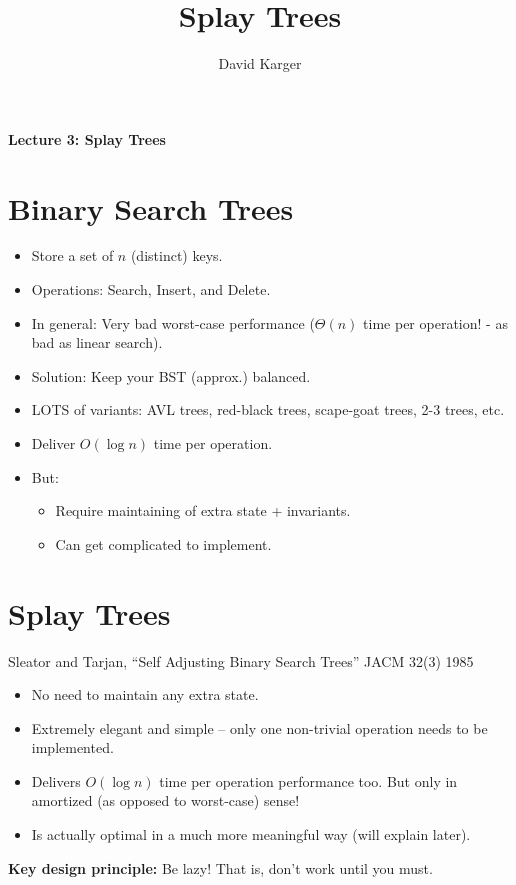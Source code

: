 \documentclass{article}
\title{Splay Trees}
\author{David Karger}
\begin{document}

\begin{center}
{\bf  Lecture 3: Splay Trees}
\end{center}

\section{Binary Search Trees}

\begin{itemize}
\item Store a set of $n$ (distinct) keys.
\item Operations: Search, Insert, and Delete.
\item In general: Very bad worst-case performance ($\Theta(n)$ time per operation! - as bad as linear search).
\item Solution: Keep your BST (approx.) balanced.
\item LOTS of variants: AVL trees, red-black trees, scape-goat trees, 2-3 trees, etc.
\item Deliver $O(\log n)$ time per operation.
\item But: 
\begin{itemize}
\item Require maintaining of extra state + invariants.
\item Can get complicated to implement.
\end{itemize} 
\end{itemize}

\section{Splay Trees}

Sleator and Tarjan, ``Self Adjusting Binary Search Trees'' JACM 32(3)
1985


\begin{itemize}
\item No need to maintain any extra state.
\item Extremely elegant and simple -- only one non-trivial operation needs to be implemented.
\item Delivers $O(\log n)$ time per operation performance too. But only in amortized (as opposed to worst-case) sense!
\item Is actually optimal in a much more meaningful way (will explain later).
\end{itemize}

{\bf Key design principle:} Be lazy! That is, don't work until you must. 
\end{document}
